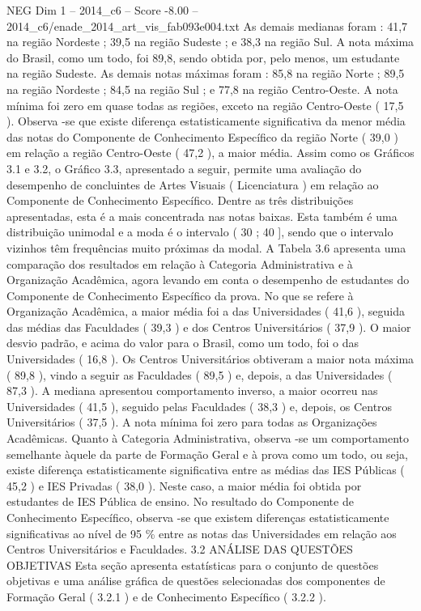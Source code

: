\begin{textsample}{NEG Dim 1 – 2014\_c6 – Score -8.00 – 2014\_c6/enade\_2014\_art\_vis\_fab093e004.txt}
As demais medianas foram : 41,7 na região Nordeste ; 39,5 na região Sudeste ; e 38,3 na região Sul.
A nota máxima do Brasil, como um todo, foi 89,8, sendo obtida por, pelo menos, um estudante na região Sudeste.
As demais notas máximas foram : 85,8 na região Norte ; 89,5 na região Nordeste ; 84,5 na região Sul ; e 77,8 na região Centro-Oeste.
A nota mínima foi zero em quase todas as regiões, exceto na região Centro-Oeste ( 17,5 ).
Observa -se que existe diferença estatisticamente significativa da menor média das notas do Componente de Conhecimento Específico da região Norte ( 39,0 ) em relação a região Centro-Oeste ( 47,2 ), a maior média.
Assim como os Gráficos 3.1 e 3.2, o Gráfico 3.3, apresentado a seguir, permite uma avaliação do desempenho de concluintes de Artes Visuais ( Licenciatura ) em relação ao Componente de Conhecimento Específico.
Dentre as três distribuições apresentadas, esta é a mais concentrada nas notas baixas.
Esta também é uma distribuição unimodal e a moda é o intervalo ( 30 ; 40 ], sendo que o intervalo vizinhos têm frequências muito próximas da modal.
A Tabela 3.6 apresenta uma comparação dos resultados em relação à Categoria Administrativa e à Organização Acadêmica, agora levando em conta o desempenho de estudantes do Componente de Conhecimento Específico da prova.
No que se refere à Organização Acadêmica, a maior média foi a das Universidades ( 41,6 ), seguida das médias das Faculdades ( 39,3 ) e dos Centros Universitários ( 37,9 ).
O maior desvio padrão, e acima do valor para o Brasil, como um todo, foi o das Universidades ( 16,8 ).
Os Centros Universitários obtiveram a maior nota máxima ( 89,8 ), vindo a seguir as Faculdades ( 89,5 ) e, depois, a das Universidades ( 87,3 ).
A mediana apresentou comportamento inverso, a maior ocorreu nas Universidades ( 41,5 ), seguido pelas Faculdades ( 38,3 ) e, depois, os Centros Universitários ( 37,5 ).
A nota mínima foi zero para todas as Organizações Acadêmicas.
Quanto à Categoria Administrativa, observa -se um comportamento semelhante àquele da parte de Formação Geral e à prova como um todo, ou seja, existe diferença estatisticamente significativa entre as médias das IES Públicas ( 45,2 ) e IES Privadas ( 38,0 ).
Neste caso, a maior média foi obtida por estudantes de IES Pública de ensino.
No resultado do Componente de Conhecimento Específico, observa -se que existem diferenças estatisticamente significativas ao nível de 95 \% entre as notas das Universidades em relação aos Centros Universitários e Faculdades. 3.2 ANÁLISE DAS QUESTÕES OBJETIVAS Esta seção apresenta estatísticas para o conjunto de questões objetivas e uma análise gráfica de questões selecionadas dos componentes de Formação Geral ( 3.2.1 ) e de Conhecimento Específico ( 3.2.2 ).

\end{textsample}
